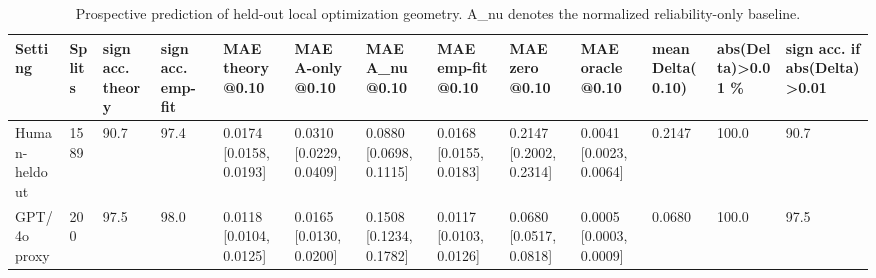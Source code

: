 \begin{table}[t]
\centering
\small
\begin{tabular}{lllllllllllll}
\toprule
Setting & Splits & sign acc. theory & sign acc. emp-fit & MAE theory @0.10 & MAE A-only @0.10 & MAE A\_nu @0.10 & MAE emp-fit @0.10 & MAE zero @0.10 & MAE oracle @0.10 & mean Delta(0.10) & abs(Delta)>0.01 \% & sign acc. if abs(Delta)>0.01 \\
\midrule
Human-heldout & 1589 & 90.7 & 97.4 & 0.0174 [0.0158, 0.0193] & 0.0310 [0.0229, 0.0409] & 0.0880 [0.0698, 0.1115] & 0.0168 [0.0155, 0.0183] & 0.2147 [0.2002, 0.2314] & 0.0041 [0.0023, 0.0064] & 0.2147 & 100.0 & 90.7 \\
GPT/4o proxy & 200 & 97.5 & 98.0 & 0.0118 [0.0104, 0.0125] & 0.0165 [0.0130, 0.0200] & 0.1508 [0.1234, 0.1782] & 0.0117 [0.0103, 0.0126] & 0.0680 [0.0517, 0.0818] & 0.0005 [0.0003, 0.0009] & 0.0680 & 100.0 & 97.5 \\
\bottomrule
\end{tabular}
\vspace{0.25em}
\caption{Prospective prediction of held-out local optimization geometry. A\_nu denotes the normalized reliability-only baseline.}
\label{tab:prospective-prediction}
\end{table}
